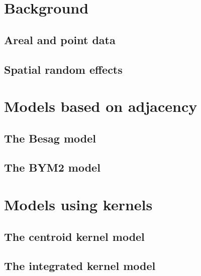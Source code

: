 \documentclass[a4paper, nobind]{templates/ociamthesis}
\begin{document}
\hypertarget{background-1}{%
\section{Background}\label{background-1}}

\hypertarget{areal-and-point-data}{%
\subsection{Areal and point data}\label{areal-and-point-data}}

\hypertarget{spatial-random-effects}{%
\subsection{Spatial random effects}\label{spatial-random-effects}}

\hypertarget{models-based-on-adjacency}{%
\section{Models based on adjacency}\label{models-based-on-adjacency}}

\hypertarget{the-besag-model}{%
\subsection{The Besag model}\label{the-besag-model}}

\hypertarget{the-bym2-model}{%
\subsection{The BYM2 model}\label{the-bym2-model}}

\hypertarget{models-using-kernels}{%
\section{Models using kernels}\label{models-using-kernels}}

\hypertarget{the-centroid-kernel-model}{%
\subsection{The centroid kernel model}\label{the-centroid-kernel-model}}

\hypertarget{the-integrated-kernel-model}{%
\subsection{The integrated kernel model}\label{the-integrated-kernel-model}}
\end{document}
